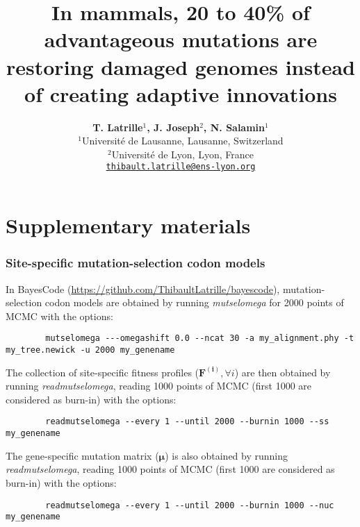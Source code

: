 \documentclass{article}
\title{In mammals, 20 to 40\% of advantageous mutations are restoring damaged genomes instead of creating adaptive innovations}
\author{
    \large
    \textbf{T. {Latrille}$^{1}$, J. {Joseph}$^{2}$, N. {Salamin}$^{1}$}\\
    \normalsize $^{1}$Université de Lausanne, Lausanne, Switzerland\\
    \normalsize $^{2}$Université de Lyon, Lyon, France \\
    \normalsize \texttt{\href{mailto:thibault.latrille@ens-lyon.org}{thibault.latrille@ens-lyon.org}} \\
}
\newcommand{\UniDimArray}[1]{\bm{#1}}
\begin{document}
    \maketitle
    \part*{Supplementary materials}
    \tableofcontents
    \clearpage

    \section{Site-specific mutation-selection codon models}\label{sec:site-specific-mutation-selection-codon-models}
    In BayesCode (\url{https://github.com/ThibaultLatrille/bayescode}), mutation-selection codon models are obtained by running \textit{mutselomega} for 2000 points of MCMC with the options:
    \begin{scriptsize}
        \begin{verbatim}
        mutselomega ---omegashift 0.0 --ncat 30 -a my_alignment.phy -t my_tree.newick -u 2000 my_genename
        \end{verbatim}
    \end{scriptsize}
    The collection of site-specific fitness profiles ($\UniDimArray{F^{(i)}}, \forall i$) are then obtained by running \textit{readmutselomega}, reading 1000 points of MCMC (first 1000 are considered as burn-in) with the options:
    \begin{scriptsize}
        \begin{verbatim}
        readmutselomega --every 1 --until 2000 --burnin 1000 --ss my_genename
        \end{verbatim}
    \end{scriptsize}
    The gene-specific mutation matrix ($\UniDimArray{\mu}$) is also obtained by running \textit{readmutselomega}, reading 1000 points of MCMC (first 1000 are considered as burn-in) with the options:
    \begin{scriptsize}
        \begin{verbatim}
        readmutselomega --every 1 --until 2000 --burnin 1000 --nuc my_genename
        \end{verbatim}
    \end{scriptsize}
\end{document}
